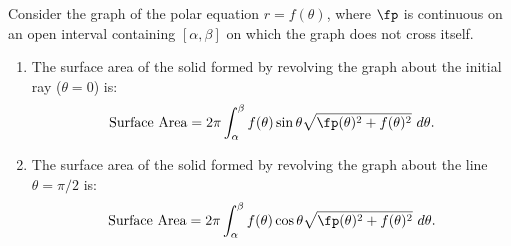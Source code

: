 {Consider the graph of the polar equation $r=f(\theta)$, where $\fp$ is continuous on an open interval containing $[\alpha,\beta]$ on which the graph does not cross itself.
	\begin{enumerate}
		\item The surface area of the solid formed by revolving the graph about the initial ray ($\theta=0$) is:
		$$\text{Surface Area} = 2\pi\int_\alpha^\beta f(\theta)\sin\theta\sqrt{\fp(\theta)^2+f(\theta)^2}\ d\theta.$$
		\item The surface area of the solid formed by revolving the graph about the line $\theta=\pi/2$ is:
		$$\text{Surface Area} = 2\pi\int_\alpha^\beta f(\theta)\cos\theta\sqrt{\fp(\theta)^2+f(\theta)^2}\ d\theta.$$
	\end{enumerate}
}

